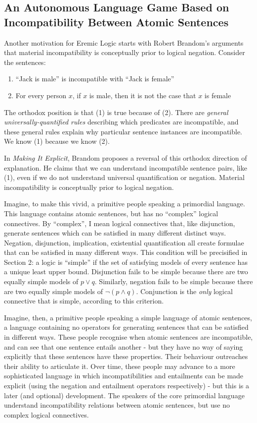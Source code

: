 \subsection{An Autonomous Language Game Based on Incompatibility Between Atomic Sentences}
Another motivation for Eremic Logic starts with Robert Brandom's arguments that material incompatibility is conceptually prior to logical negation.
Consider the sentences:
\begin{enumerate}
\item
``Jack is male'' is incompatible with ``Jack is female''
\item
For every person $x$, if $x$ is male, then it is not the case that $x$ is female
\end{enumerate}
The orthodox position is that (1) is true because of (2). 
There are \emph{general universally-quantified rules} describing which predicates are incompatible, and these general rules explain why particular sentence instances are incompatible. 
We know (1) because we know (2).

In  \emph{Making It Explicit}, Brandom proposes a reversal of this orthodox direction of explanation.
He claims that we can understand incompatible sentence pairs, like (1), even if we do not understand universal quantification or negation. 
Material incompatibility is conceptually prior to logical negation.

Imagine, to make this vivid, a primitive people speaking a primordial language. 
This language contains atomic sentences, but has no ``complex'' logical connectives. 
By ``complex'', I mean logical connectives that, like disjunction, generate sentences which can be satisfied in many different distinct ways.  Negation, disjunction, implication, existential quantification all create formulae that can be satisfied in many different ways. This condition will be precisified in Section 2: a logic is ``simple'' if the set of satisfying models of every sentence has a unique least upper bound. Disjunction fails to be simple because there are two equally simple models of $p \lor q$. Similarly, negation fails to be simple because there are two equally simple models of $\neg (p \land q)$. Conjunction is the \emph{only} logical connective that is simple, according to this criterion.

Imagine, then, a primitive people speaking a simple language of atomic sentences, a language containing no operators for generating sentences that can be satisfied in different ways.
These people recognise when atomic sentences are incompatible, and can see that one sentence entails another - but they have no way of saying explicitly that these sentences have these properties.
Their behaviour outreaches their ability to articulate it.
Over time, these people may advance to a more sophisticated language in which incompatibilities and entailments can be made explicit (using the negation and entailment operators respectively) - but this is a later (and optional) development. The speakers of the core primordial language understand incompatibility relations between atomic sentences, but use no complex logical connectives.

